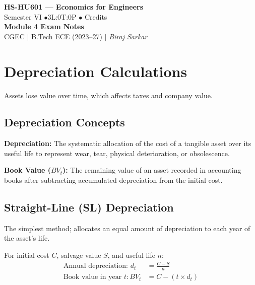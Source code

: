 \documentclass[12pt,a4paper]{article}
\begin{document}

\begin{center}
  {\LARGE\bfseries\color{myred} HS-HU601 --- Economics for Engineers}\\[5pt]
  {\normalsize\color{mydark} Semester VI \quad$\bullet$\quad 3L:0T:0P \quad$\bullet$ Credits}\\[3pt]
  {\normalsize\color{myteal}\textbf{Module 4 Exam Notes}}\\[3pt]
  {\small\color{mydark} CGEC \;$|$\; B.Tech ECE (2023--27) \;$|$\; \textit{Biraj Sarkar}}
\end{center}
\vspace{2pt}
\noindent{\color{myred}\rule{\linewidth}{1.5pt}}
\vspace{2pt}

\hypersetup{linkcolor=mydark}
\tableofcontents
\hypersetup{linkcolor=myteal}
\newpage

\section{Depreciation Calculations}

Assets lose value over time, which affects taxes and company value.

\subsection{Depreciation Concepts}
\begin{tcolorbox}[defbox]
\textbf{Depreciation:} The systematic allocation of the cost of a tangible asset over its useful life to represent wear, tear, physical deterioration, or obsolescence.
\par\vspace{3pt}
\textbf{Book Value ($BV_t$):} The remaining value of an asset recorded in accounting books after subtracting accumulated depreciation from the initial cost.
\end{tcolorbox}

\subsection{Straight-Line (SL) Depreciation}
The simplest method; allocates an equal amount of depreciation to each year of the asset's life.
\begin{tcolorbox}[formulabox, title={\textbf{Straight-Line Formulas}}]
For initial cost $C$, salvage value $S$, and useful life $n$:
\begin{align}
  \text{Annual depreciation: } d_t &= \frac{C - S}{n} \\[4pt]
  \text{Book value in year } t: BV_t &= C - (t \times d_t)
\end{align}
\end{tcolorbox}
\end{document}

